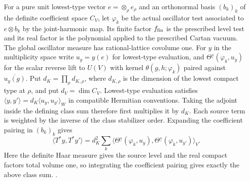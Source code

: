 For a pure unit lowest-type vector \(e=\otimes_\rho e_\rho\)
and an orthonormal basis \((b_k)_k\) of the definite coefficient
space \(C_V\), let \(\varphi_k\) be the actual oscillator test
associated to \(e\otimes b_k\) by the joint-harmonic map. Its
finite factor \(f_{\rm fin}\) is the prescribed level test and its
real factor is the polynomial applied to the prescribed Cartan
vacuum. The global oscillator measure has rational-lattice covolume
one. For \(y\) in the multiplicity space write \(u_y=y(e)\) for
lowest-type evaluation, and \(\Theta^\uparrow(\varphi_k,u_y)\)
for the scalar reverse lift to \(U(V)\) with kernel
\(\theta(g,h;\varphi_k)\) paired against \(\overline{u_y(g)}\).
Put \(d_K=\prod_\rho d_{K,\rho}\), where \(d_{K,\rho}\) is
the dimension of the lowest compact type at \(\rho\), and put
\(d_V=\dim C_V\).
Lowest-type evaluation satisfies
\(\langle y,y'\rangle=d_K\langle u_y,u_{y'}\rangle_{W}\)
in compatible Hermitian conventions. Taking the adjoint inside
the defining class sum therefore first multiplies it by \(d_K\).
Each source term is weighted by the inverse of the class
stabilizer order. Expanding the coefficient pairing in \((b_k)_k\)
gives
\[
 \langle T^*y,T^*y'\rangle
    =d_K^2\sum_k
       \langle\Theta^\uparrow(\varphi_k,u_y),
              \Theta^\uparrow(\varphi_k,u_{y'})\rangle_V .
\]
Here the definite Haar measure gives the source level and the
real compact factors total volume one, so integrating the
coefficient pairing gives exactly the above class sum.
.

